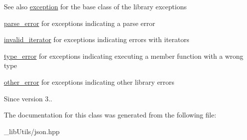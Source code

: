 \begin{DoxySeeAlso}{See also}
\hyperlink{classnlohmann_1_1detail_1_1exception}{exception} for the base class of the library exceptions 

\hyperlink{classnlohmann_1_1detail_1_1parse__error}{parse\+\_\+error} for exceptions indicating a parse error 

\hyperlink{classnlohmann_1_1detail_1_1invalid__iterator}{invalid\+\_\+iterator} for exceptions indicating errors with iterators 

\hyperlink{classnlohmann_1_1detail_1_1type__error}{type\+\_\+error} for exceptions indicating executing a member function with a wrong type 

\hyperlink{classnlohmann_1_1detail_1_1other__error}{other\+\_\+error} for exceptions indicating other library errors
\end{DoxySeeAlso}
\begin{DoxySince}{Since}
version 3.. 
\end{DoxySince}


The documentation for this class was generated from the following file\+:\begin{DoxyCompactItemize}
\item 
\+\_\+lib\+Utils/json.\+hpp\end{DoxyCompactItemize}

